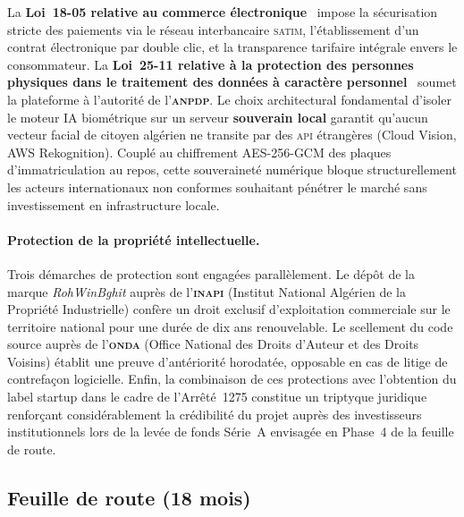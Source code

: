 La \textbf{Loi~18-05 relative au commerce électronique}~\cite{loi1805_2018} impose la sécurisation stricte des paiements via le réseau interbancaire \textsc{satim}, l'établissement d'un contrat électronique par double clic, et la transparence tarifaire intégrale envers le consommateur. La \textbf{Loi~25-11 relative à la protection des personnes physiques dans le traitement des données à caractère personnel}~\cite{loi2511_2025} soumet la plateforme à l'autorité de l'\textbf{\textsc{anpdp}}. Le choix architectural fondamental d'isoler le moteur IA biométrique sur un serveur \textbf{souverain local} garantit qu'aucun vecteur facial de citoyen algérien ne transite par des \textsc{api} étrangères (Cloud Vision, AWS Rekognition). Couplé au chiffrement AES-256-GCM des plaques d'immatriculation au repos, cette souveraineté numérique bloque structurellement les acteurs internationaux non conformes souhaitant pénétrer le marché sans investissement en infrastructure locale.

\paragraph{Protection de la propriété intellectuelle.} Trois démarches de protection sont engagées parallèlement. Le dépôt de la marque \textit{RohWinBghit} auprès de l'\textbf{\textsc{inapi}} (Institut National Algérien de la Propriété Industrielle) confère un droit exclusif d'exploitation commerciale sur le territoire national pour une durée de dix ans renouvelable. Le scellement du code source auprès de l'\textbf{\textsc{onda}} (Office National des Droits d'Auteur et des Droits Voisins) établit une preuve d'antériorité horodatée, opposable en cas de litige de contrefaçon logicielle. Enfin, la combinaison de ces protections avec l'obtention du label startup dans le cadre de l'Arrêté~1275 constitue un triptyque juridique renforçant considérablement la crédibilité du projet auprès des investisseurs institutionnels lors de la levée de fonds Série~A envisagée en Phase~4 de la feuille de route.

\subsection{Feuille de route (18 mois)}
\label{sec:roadmap}

